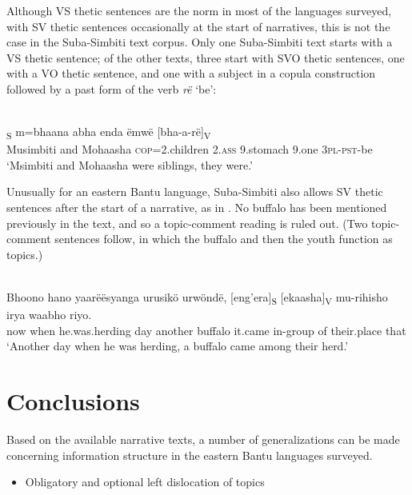 \documentclass[output=paper]{langsci/langscibook}
\begin{document}
Although VS thetic sentences are the norm in most of the languages surveyed, with SV thetic sentences occasionally at the start of narratives, this is not the case in the Suba-Simbiti text corpus. Only one Suba-Simbiti text starts with a VS thetic sentence; of the other texts, three start with SVO thetic sentences, one with a VO thetic sentence, and one with a subject in a copula construction followed by a past form of the verb \textit{rë} ‘be’:


\ea\label{ex:29.nicolle}
\\
\textsubscript{S} m=bhaana abha enda ëmwë [bha-a-rë]\textsubscript{V}\\
{\db}Musimbiti and Mohaasha \textsc{cop}=2.children 2.\textsc{ass} 9.stomach 9.one {\db}\textsc{3pl-pst}-be\\
\glt ‘Msimbiti and Mohaasha were siblings, they were.’
\z

Unusually for an eastern Bantu language, Suba-Simbiti also allows SV thetic sentences after the start of a narrative, as in . No buffalo has been mentioned previously in the text, and so a topic-comment reading is ruled out. (Two topic-comment sentences follow, in which the buffalo and then the youth function as topics.)

\ea\label{ex:30.nicolle}
\\
\gll Bhoono hano yaarëësyanga urusikö urwöndë, [eng’era]\textsubscript{S} [ekaasha]\textsubscript{V} mu-rihisho irya waabho riyo.\\
now when he.was.herding day another {\db}buffalo {\db}it.came in-group of their.place that\\
\glt ‘Another day when he was herding, a buffalo came among their herd.’
\z

\section{Conclusions}\label{§6:conclusions.nicolle}

Based on the available narrative texts, a number of generalizations can be made concerning information structure in the eastern Bantu languages surveyed.

\begin{itemize}
\item Obligatory and optional left dislocation of topics
\end{itemize}
\end{document}
